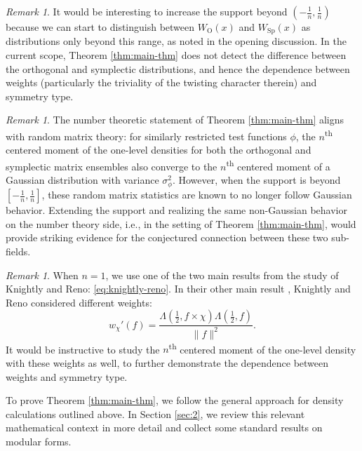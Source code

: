 \documentclass[12pt, reqno,oneside]{amsart}
\theoremstyle{plain}
\theoremstyle{definition}
\theoremstyle{remark}
\newtheorem{remark}[theorem]{Remark}
\theoremstyle{plain}
\numberwithin{equation}{section}
\begin{document}
\begin{remark}\label{rmk:diff}
It would be interesting to increase the support beyond $(-\frac{1}{n},\frac{1}{n})$ because we can start to distinguish between $W_\text{O}(x)$ and $W_\text{Sp}(x)$ as distributions only beyond this range, as noted in the opening discussion. In the current scope, Theorem \ref{thm:main-thm} does not detect the difference between the orthogonal and symplectic distributions, and hence the dependence between weights (particularly the triviality of the twisting character therein) and symmetry type. 
\end{remark}

\begin{remark}\label{rmk:rmt}
The number theoretic statement of Theorem \ref{thm:main-thm} aligns with random matrix theory: for similarly restricted test functions $\phi$, the $n$\textsuperscript{th} centered moment of the one-level densities for both the orthogonal and symplectic matrix ensembles \cite{HM07, HR07} also converge to the $n$\textsuperscript{th} centered moment of a Gaussian distribution with variance $\sigma_\phi^2$. However, when the support is beyond $[-\frac{1}{n},\frac{1}{n}]$, these random matrix statistics are known to no longer follow Gaussian behavior. Extending the support and realizing the same non-Gaussian behavior on the number theory side, i.e., in the setting of Theorem \ref{thm:main-thm}, would provide striking evidence for the conjectured connection between these two sub-fields.
\end{remark}

\begin{remark}
When $n=1$, we use one of the two main results from the study of Knightly and Reno: \eqref{eq:knightly-reno}. In their other main result \cite[Theorem 1.3]{KR18}, Knightly and Reno considered different weights:
\begin{equation}\label{eq:alternate-weight}
    w_{\chi}'(f)=\frac{\Lambda\left(\frac{1}{2},f\times\chi\right)\Lambda\left(\frac{1}{2},f\right)}{\lVert f\rVert^2}.
\end{equation}
It would be instructive to study the $n$\textsuperscript{th} centered moment of the one-level density with these weights as well, to further demonstrate the dependence between weights and symmetry type. 
\end{remark}



To prove Theorem \ref{thm:main-thm}, we follow the general approach for density calculations outlined above. In Section \ref{sec:2}, we review this relevant mathematical context in more detail and collect some standard results on modular forms.
\end{document}
